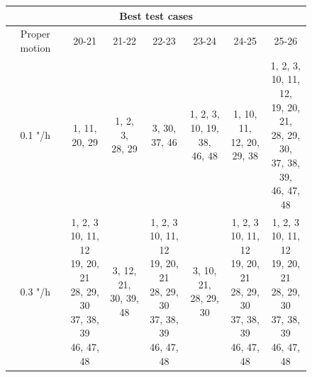 \documentclass{article}
\begin{document}
\begin{figure}[H]
\centering
\begin{tabular}{|c|c|c|c|c|c|c|}
\hline
\multicolumn{7}{|c|}{Best test cases}\\
\hline \hline
Proper motion & 20-21 & 21-22 & 22-23 & 23-24 & 24-25 & 25-26\\
\hline \hline
0.1 "/h & \makecell{1, 11, \\ 20, 29} & \makecell{1, 2, 3, \\ 28, 29} & \makecell{3, 30, \\ 37, 46}  & \makecell{1, 2, 3, \\ 10, 19, 38, \\ 46, 48} & \makecell{1, 10, 11, \\ 12, 20, \\ 29, 38} & \makecell{1, 2, 3, \\ 10, 11, 12, \\ 19, 20, 21, \\ 28, 29, 30, \\ 37, 38, 39, \\ 46, 47, 48}\\
\hline
0.3 "/h & \makecell{1, 2, 3 \\ 10, 11, 12 \\ 19, 20, 21 \\ 28, 29, 30 \\ 37, 38, 39 \\ 46, 47, 48} & \makecell{3, 12, 21, \\ 30, 39, 48} & \makecell{1, 2, 3 \\ 10, 11, 12 \\ 19, 20, 21 \\ 28, 29, 30 \\ 37, 38, 39 \\ 46, 47, 48} & \makecell{3, 10, 21, \\ 28, 29, 30}  & \makecell{1, 2, 3 \\ 10, 11, 12 \\ 19, 20, 21 \\ 28, 29, 30 \\ 37, 38, 39 \\ 46, 47, 48} & \makecell{1, 2, 3 \\ 10, 11, 12 \\ 19, 20, 21 \\ 28, 29, 30 \\ 37, 38, 39 \\ 46, 47, 48}\\
\hline

\end{tabular}
\end{figure}
\end{document}
